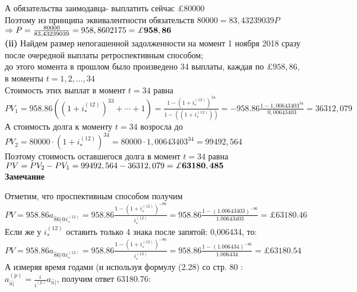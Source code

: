 \documentclass{article}
\begin{document}
А обязательства заимодавца- выплатить сейчас \pounds 80000\\
Поэтому из принципа эквивалентности обязательств $ 80000= 83,43239039P$
$\Rightarrow P = \frac {80000}{83,43239039} = 958,8602175 = \bf \pounds 958,86$\\




{\bf \large  (ii)}   Найдем размер непогашенной задолженности на момент 1 ноября  2018 сразу после  очередной выплаты ретроспективным способом;\\
до этого  момента  в прошлом   было произведено 34 выплаты,  каждая по  $\pounds 958,86,$ в моменты $t=1,2, \dots, 34$\\

Стоимость этих выплат в момент $t=34$ равна\\
 $PV_1= 958.86 ( (1+i_{*}^{(12)} )^{33} + \cdots + 1) = \frac {1 - (1+i_{*}^{(12)} )^{34} }{ 1 - ((1+i_{*}^{(12)} ))} = -958.86 \frac{1-1,00643403^{34}}{0,00643403} = 36312,079$\\

А стоимость долга к моменту $t=34$ возросла до \\
$PV_2= 80000 \cdot (1+i_{*}^{(12)} )^{34} = 80000 \cdot 1,00643403^{34} = 99492,564$\\

Поэтому стоимость оставшегося долга в момент $t=34$ равна\\

$PV=PV_2-PV_1 = 99492,564-36312,079= \bf \pounds63180,485$\\

{\bf Замечание}

Отметим, что проспективным способом получим
 $PV=958.86 a_{  \overset{-}86 | @  i_{*}^{(12)}  } = 958.86 \frac { 1 - (1+i_{*}^{(12)})^{-86} }{i_{*}^{(12)}} = 
   958.86 \frac { 1 - (1.00643403)^{-86} }{ 1.00643403} = \pounds 63180.46$\\
 
 Если же у $ i_{*}^{(12)}$ оставить только 4 знака после запятой:  0,006434, то:\\
 
 $PV=958.86 a_{\overset{-}86 | @  i_{*}^{(12)}} = 958.86 \frac { 1 - (1+i_{*}^{(12)})^{-86} }{i_{*}^{(12)}} = 
   958.86 \frac { 1 - (1.006434)^{-86} }{ 1.006434} = \pounds 63180.54$\\
 
 
 А измеряя время годами (и используя формулу  (2.28) со стр. 80 : \\
 $  \boxed {a^{(p)}_{\overset{-}n | } = \frac {i}{i^{(p)} }   a_{\overset{-}n | }}$,
 получим ответ 63180.76:\\
 
\end{document}
